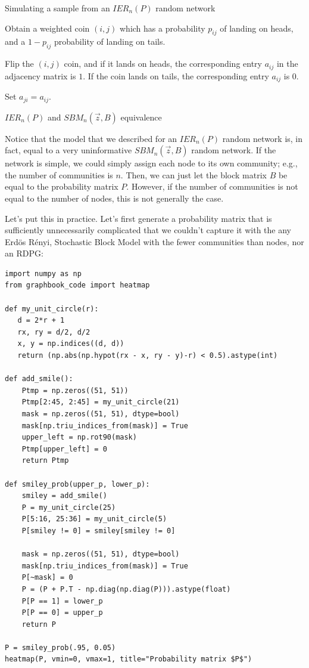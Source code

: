 \begin{algorithm}[h]\caption{Simulating a sample from an $IER_n(P)$ random network}
\label{alg:ch5:ier}
\SetAlgoLined
{}

 {
     {
        Obtain a weighted coin $(i,j)$ which has a probability $p_{ij}$ of landing on heads, and a $1 - p_{ij}$ probability of landing on tails.

        Flip the $(i,j)$ coin, and if it lands on heads, the corresponding entry $a_{ij}$ in the adjacency matrix is $1$. If the coin lands on tails, the corresponding entry $a_{ij}$ is $0$. 

        Set $a_{ji} = a_{ij}$.
    }
}
\end{algorithm}

\begin{floatingbox}[h]\caption{$IER_n(P)$ and $SBM_n(\vec z, B)$ equivalence}
Notice that the model that we described for an $IER_n(P)$ random network is, in fact, equal to a very uninformative $SBM_n(\vec z, B)$ random network. If the network is simple, we could simply assign each node to its own community; e.g., the number of communities is $n$. Then, we can just let the block matrix $B$ be equal to the probability matrix $P$. However, if the number of communities is not equal to the number of nodes, this is not generally the case.
\end{floatingbox}

Let's put this in practice. Let's first generate a probability matrix that is sufficiently unnecessarily complicated that we couldn't capture it with the any Erd\"os R\'enyi, Stochastic Block Model with the fewer communities than nodes, nor an RDPG:

\begin{lstlisting}[style=python]
import numpy as np
from graphbook_code import heatmap

def my_unit_circle(r):
   d = 2*r + 1
   rx, ry = d/2, d/2
   x, y = np.indices((d, d))
   return (np.abs(np.hypot(rx - x, ry - y)-r) < 0.5).astype(int)

def add_smile():
    Ptmp = np.zeros((51, 51))
    Ptmp[2:45, 2:45] = my_unit_circle(21)
    mask = np.zeros((51, 51), dtype=bool)
    mask[np.triu_indices_from(mask)] = True
    upper_left = np.rot90(mask)
    Ptmp[upper_left] = 0
    return Ptmp
    
def smiley_prob(upper_p, lower_p):
    smiley = add_smile()
    P = my_unit_circle(25)
    P[5:16, 25:36] = my_unit_circle(5)
    P[smiley != 0] = smiley[smiley != 0]
    
    mask = np.zeros((51, 51), dtype=bool)
    mask[np.triu_indices_from(mask)] = True
    P[~mask] = 0
    P = (P + P.T - np.diag(np.diag(P))).astype(float)
    P[P == 1] = lower_p
    P[P == 0] = upper_p
    return P

P = smiley_prob(.95, 0.05)
heatmap(P, vmin=0, vmax=1, title="Probability matrix $P$")
\end{lstlisting}

